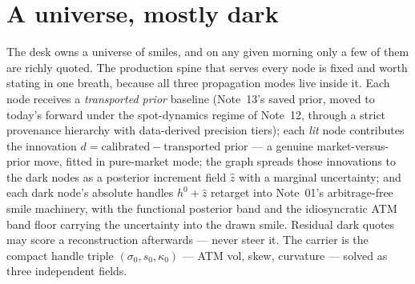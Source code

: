 \documentclass[11pt]{article}
\begin{document}
\begin{abstract}
$\gtpabresidual$-point idiosyncratic dislocation that survives the
source's next tick), and the note derives why the other two \emph{cannot}
--- not as defects, but as exactly the assertions they decline to make.
Every mean-semantics behaviour quoted here runs through the production
solver and is locked by a golden test; every empirical level is read from
stored study artifacts; and the mode question itself is adjudicated by
pre-registered gates whose recorded verdicts are quoted honestly --- both
of them, for the target regime has now been scored.  At the daily
granularity the layered spatial solve carries the family's only measured
edge in the stressed regimes --- exactly where books bleed --- while
day-old residual memory does not pay.  And on the intraday async replay
the mode's central mechanism is \emph{validated}: the residual memory has
an interior optimum near a tenth of a day, with per-bucket skill decaying
exactly as the OU prior predicts --- the daily harness's ``memory never
pays'' was a horizon artifact, as this note argued it would be.  What the
same replay also shows, and this note reports with equal honesty, is that
the message operator's reciprocal carrier outruns every layered arm on
that universe: the recorded decision is the mechanism validated, adoption
held, and a NAMES campaign --- where directedness should finally earn its
cut --- on the books.
\end{abstract}

\newpage
\tableofcontents
\newpage

\section{A universe, mostly dark}
\label{sec:problem}

The desk owns a universe of smiles, and on any given morning only a few of
them are richly quoted.  The production spine that serves every node is
fixed and worth stating in one breath, because all three propagation modes
live inside it.  Each node receives a \emph{transported prior} baseline
(Note~13's saved prior, moved to today's forward under the spot-dynamics
regime of Note~12, through a strict provenance hierarchy with data-derived
precision tiers); each \emph{lit} node contributes the innovation
$d=\text{calibrated}-\text{transported prior}$ --- a genuine
market-versus-prior move, fitted in pure-market mode; the graph spreads
those innovations to the dark nodes as a posterior increment field
$\widehat z$ with a marginal uncertainty; and each dark node's absolute
handles $h^0+\widehat z$ retarget into Note~01's arbitrage-free smile
machinery, with the functional posterior band and the idiosyncratic ATM
band floor carrying the uncertainty into the drawn smile.  Residual dark
quotes may score a reconstruction afterwards --- never steer it.  The
carrier is the compact handle triple $(\sigma_0,s_0,\kappa_0)$ --- ATM vol,
skew, curvature --- solved as three independent fields.
\end{document}
